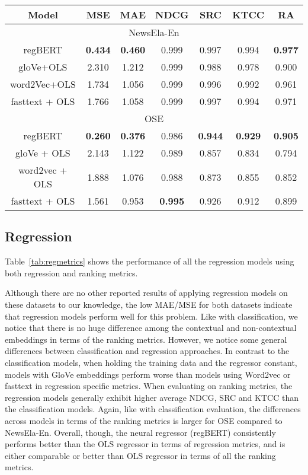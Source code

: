 \documentclass[11pt]{article}
\begin{document}
\begin{table*}[htb!]
\centering
\begin{tabular}{|c|c|c|c|c|c|c|}
 \hline
 Model & MSE & MAE & NDCG & SRC & KTCC & RA\\
 \hline
 \multicolumn{7}{|c|}{NewsEla-En} \\
 \hline
 regBERT & \textbf{0.434}   & \textbf{0.460} & 0.999 & 0.997 & 0.994 & \textbf{0.977}\\
 gloVe+OLS & 2.310 & 1.212 &0.999 & 0.988 & 0.978 & 0.900\\
 word2Vec+OLS & 1.734    & 1.056& 0.999 & 0.996 & 0.992 & 0.961\\
 fasttext + OLS&  1.766   & 1.058& 0.999 & 0.997 & 0.994 & 0.971 \\
  \hline \multicolumn{7}{|c|}{OSE} \\
\hline
regBERT&  \textbf{0.260}   & \textbf{0.376} &0.986 & \textbf{0.944} & \textbf{0.929} & \textbf{0.905}\\
gloVe + OLS & 2.143 & 1.122& 0.989 & 0.857 & 0.834 & 0.794\\
 word2vec + OLS &  1.888   & 1.076 & 0.988 & 0.873 & 0.855 & 0.852 \\
 fasttext + OLS &  1.561   & 0.953 & \textbf{0.995} & 0.926 & 0.912 & 0.899\\ \hline
 \end{tabular}
\caption{Performance of Regression approaches}
\label{tab:regmetrics}
\end{table*}

\subsection{Regression}
Table~\ref{tab:regmetrics} shows the performance of all the regression models using both regression and ranking metrics. 

Although there are no other reported results of applying regression models on these datasets to our knowledge, the low MAE/MSE for both datasets indicate that regression models perform well for this problem. Like with classification, we notice that there is no huge difference among the contextual and non-contextual embeddings in terms of the ranking metrics. However, we notice some general differences between classification and regression approaches. In contrast to the classification models, when holding the training data and the regressor constant, models with GloVe embeddings perform worse than models using Word2vec or fasttext in regression specific metrics. When evaluating on ranking metrics, the regression models generally exhibit higher average NDCG, SRC and KTCC than the classification models. Again, like with classification evaluation, the differences across models in terms of the ranking metrics is larger for OSE compared to NewsEla-En. Overall, though, the neural regressor (regBERT) consistently performs better than the OLS regressor in terms of regression metrics, and is either comparable or better than OLS regressor in terms of all the ranking metrics. 
\end{document}
